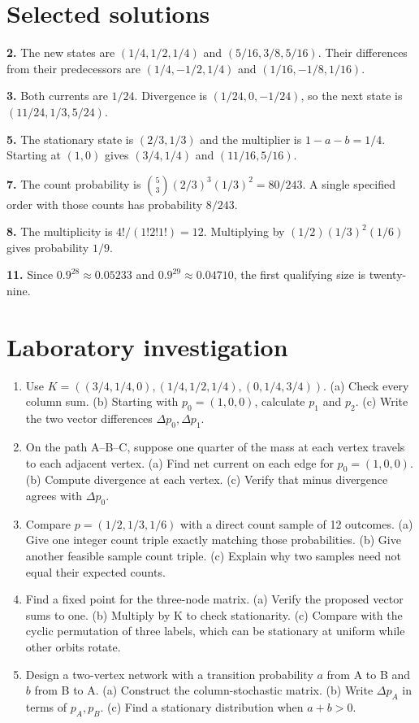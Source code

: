 \documentclass[11pt,oneside,openany]{book}
\theoremstyle{definition}
\theoremstyle{remark}
\numberwithin{equation}{chapter}
\providecommand{\tightlist}{\setlength{\itemsep}{0pt}\setlength{\parskip}{0pt}}
\newcommand{\labheading}{\FloatBarrier\section*{Laboratory investigation}\addcontentsline{toc}{section}{Laboratory investigation}}
\begin{document}
\section{Selected solutions}\label{ch04-selected-solutions}

\textbf{2.} The new states are \((1/4,1/2,1/4)\) and \((5/16,3/8,5/16)\). Their differences from their predecessors are \((1/4,-1/2,1/4)\) and \((1/16,-1/8,1/16)\).

\textbf{3.} Both currents are \(1/24\). Divergence is \((1/24,0,-1/24)\), so the next state is \((11/24,1/3,5/24)\).

\textbf{5.} The stationary state is \((2/3,1/3)\) and the multiplier is \(1-a-b=1/4\). Starting at \((1,0)\) gives \((3/4,1/4)\) and \((11/16,5/16)\).

\textbf{7.} The count probability is \(\binom53(2/3)^3(1/3)^2=80/243\). A single specified order with those counts has probability \(8/243\).

\textbf{8.} The multiplicity is \(4!/(1!2!1!)=12\). Multiplying by \((1/2)(1/3)^2(1/6)\) gives probability \(1/9\).

\textbf{11.} Since \(0.9^{28}\approx0.05233\) and \(0.9^{29}\approx0.04710\), the first qualifying size is twenty-nine.
\labheading\begin{enumerate}
\def\labelenumi{\arabic{enumi}.}
\tightlist
\item
  Use \(K=((3/4,1/4,0),(1/4,1/2,1/4),(0,1/4,3/4))\). (a) Check every column sum. (b) Starting with \(p_0=(1,0,0)\), calculate \(p_1\) and \(p_2\). (c) Write the two vector differences \(\Delta p_0,\Delta p_1\).
\item
  On the path A--B--C, suppose one quarter of the mass at each vertex travels to each adjacent vertex. (a) Find net current on each edge for \(p_0=(1,0,0)\). (b) Compute divergence at each vertex. (c) Verify that minus divergence agrees with \(\Delta p_0\).
\item
  Compare \(p=(1/2,1/3,1/6)\) with a direct count sample of 12 outcomes. (a) Give one integer count triple exactly matching those probabilities. (b) Give another feasible sample count triple. (c) Explain why two samples need not equal their expected counts.
\item
  Find a fixed point for the three-node matrix. (a) Verify the proposed vector sums to one. (b) Multiply by K to check stationarity. (c) Compare with the cyclic permutation of three labels, which can be stationary at uniform while other orbits rotate.
\item
  Design a two-vertex network with a transition probability \(a\) from A to B and \(b\) from B to A. (a) Construct the column-stochastic matrix. (b) Write \(\Delta p_A\) in terms of \(p_A,p_B\). (c) Find a stationary distribution when \(a+b>0\).
\end{enumerate}
\end{document}
